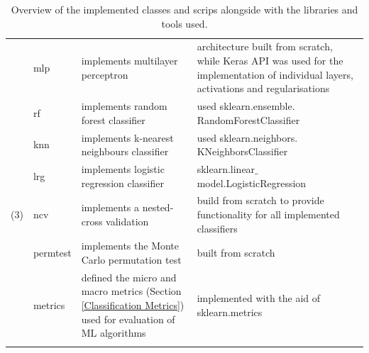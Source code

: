 \begin{longtable}{|p{}|p{}|p{}|p{}|}
                  & mlp                & implements multilayer perceptron                                                                                & architecture built from scratch, while Keras API was used for the implementation of individual layers, activations and regularisations         \\

                  & rf                 & implements random forest classifier                                                                             & used   sklearn.ensemble. RandomForestClassifier                                                                                                \\
                  & knn                & implements k-nearest neighbours classifier                                                                      & used sklearn.neighbors. KNeighborsClassifier                                                                                                   \\
                  & lrg                & implements logistic regression classifier                                                                       & sklearn.linear$\_$model.LogisticRegression                                                                                                     \\

  \hline

  (3)             & ncv                & implements a nested-cross validation                                                                            & build from scratch to provide functionality for all implemented classifiers                                                                    \\

                  & permtest           & implements the Monte Carlo permutation test                                                                     & built from scratch                                                                                                                             \\

                  & metrics            & defined the micro and macro metrics (Section \ref{Classification Metrics}) used for evaluation of ML algorithms & implemented with the aid of sklearn.metrics                                                                                                    \\


  \hline
  \caption[Repository Overview]{Overview of the implemented classes and scrips alongside with the libraries and tools used.}
  \label{repo_overview}
\end{longtable} \bigskip


